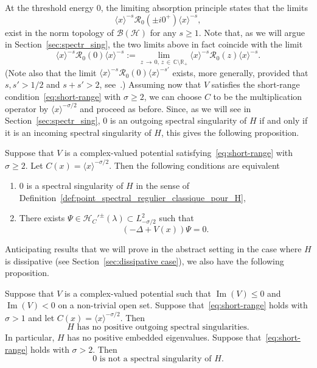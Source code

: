 \documentclass[AHL,Unicode,longabstracts,published]{cedram}
\newcommand{\Hi}{\mathcal{H}}
\newcommand{\bbC}{\mathbb{C}}
\newcommand{\R}{\mathbb{R}}
\newcommand{\Res}{\mathcal{R}}
\newcommand{\clB}{\mathcal{B}}
\DeclareMathOperator{\im}{Im}
\newcommand*{\romanenumi}{\renewcommand*{\theenumi}{\roman{enumi}}}
\newcommand*\bbC{\mathbb{C}}
\newcommand{\Hi}{\mathcal{H}}
\newcommand{\R}{\mathbb{R}}
\DeclareMathOperator{\im}{Im}
\begin{document}
At the threshold energy $0$, the limiting absorption principle states that the limits
\begin{equation*}
\langle x\rangle^{-s}\Res_0\left(\pm i0^+\right)\langle x\rangle^{-s},
\end{equation*}
exist in the norm topology of $\clB(\Hi)$ for any $s\ge 1$. Note that, as we will argue in Section~\ref{sec:spectr_sing}, the two limits above in fact coincide with the limit
\begin{equation*}
\langle x\rangle^{-s}\Res_0(0)\langle x\rangle^{-s} := \lim_{z\,\to\,0,\,z\,\in\,\bbC\setminus\R_+}\langle x\rangle^{-s}\Res_0(z)\langle x\rangle^{-s}.
\end{equation*}
(Note also that the limit $\langle x\rangle^{-s}\Res_0(0)\langle x\rangle^{-s'}$ exists, more generally, provided that $s,s'>1/2$ and $s+s'>2$, see~\cite{JeKa79_01}.) Assuming now that $V$ satisfies the short-range condition~\eqref{eq:short-range} with $\sigma\geq 2$, we can choose $C$ to be the multiplication operator by $\langle x\rangle^{-\sigma/2}$ and proceed as before. Since, as we will see in Section~\ref{sec:spectr_sing}, $0$ is an outgoing spectral singularity of $H$ if and only if it is an incoming spectral singularity of $H$, this gives the following proposition.

\begin{prop}
Suppose that $V$ is a complex-valued potential satisfying~\eqref{eq:short-range} with $\sigma\geq 2$. Let $C(x)=\langle x\rangle^{-\sigma/2}$. Then the following conditions are equivalent
\begin{enumerate}\romanenumi
\item\label{it:spec_sing_schr-zero}
$0$ is a spectral singularity of $H$ in the sense of Definition~\ref{def:point_spectral_regulier_classique_pour_H},
\item\label{it:res_state_schr-zero}
There exists $\Psi\in\Hi_C'^\pm(\lambda) \subset L^2_{-\sigma/2}$ such that
\begin{equation*}
(-\Delta+V(x))\Psi=0.
\end{equation*}
\end{enumerate}
\end{prop}

Anticipating results that we will prove in the abstract setting in the case where $H$ is dissipative (see Section~\ref{sec:dissipative case}), we also have the following proposition.

\begin{prop}\label{prop:schr_diss}
Suppose that $V$ is a complex-valued potential such that $\im(V)\le0$ and $\im(V)<0$ on a non-trivial open set. Suppose that~\eqref{eq:short-range} holds with $\sigma>1$ and let $C(x)=\langle x\rangle^{-\sigma/2}$. Then
\begin{equation*}
H \text{ has no positive outgoing spectral singularities}.
\end{equation*}
In particular, $H$ has no positive embedded eigenvalues. Suppose that~\eqref{eq:short-range} holds with $\sigma>2$. Then
\begin{equation*}
0 \text{ is not a spectral singularity of }H.
\end{equation*}
\end{prop}
\end{document}
